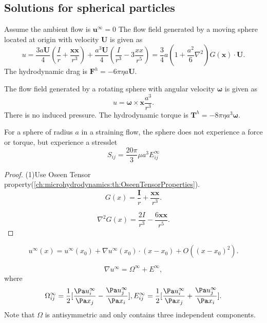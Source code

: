 \begin{refsection}
\begin{remark}
	
\end{remark}

\subsection{Solutions for spherical particles }

\begin{lemma}\cite[33,43,53]{guazzelli2011physical}
Assume the ambient flow is $\bm{u}^\infty = 0$ The flow field generated by a moving sphere located at origin with velocity $\bm{U}$ is given as 
	$$u = \frac{3a\bm{U}}{4}(\frac{I}{r} + \frac{\bm{xx}}{r^3}) + \frac{a^3\bm{U}}{4}(\frac{I}{r^3} - 3\frac{xx}{r^5}) = \frac{3}{4}a(1+\frac{a^2}{6}\nabla^2)G(\bm{x})\cdot \bm{U}.$$
The hydrodynamic drag is $\bm{F}^h = -6\pi\eta a \bm{U}$.

The flow field generated by a rotating sphere with angular velocity $\bm{\omega}$ is given as
$$u = \bm{\omega}\times \bm{x}\frac{a^3}{r^3}.$$
There is no induced pressure. The hydrodynamic torque is $\bm{T}^h = -8\pi\eta a^3 \bm{\omega}$.

For a sphere of radius $a$ in a straining flow, the sphere does not experience a force or torque, but experience a stresslet 
$$S_{ij} = \frac{20\pi}{3}\mu a^3 E_{ij}^\infty$$
\end{lemma}
\begin{proof}
(1)Use Oseen Tensor property(\autoref{ch:microhydrodynamics:th:OseenTensorProperties}).
$$G(x) = \frac{\bm{I}}{r} + \frac{\bm{xx}}{r^3}.$$
	
$$\nabla^2 G(x) = \frac{2I}{r^3} - \frac{6\bm{xx}}{r^5}.$$
\end{proof}




\begin{remark}\cite[54]{guazzelli2011physical}
	
\end{remark}



\begin{definition}
	$$u^\infty(x) = u^\infty(x_0) + \nabla u^\infty(x_0) \cdot (x - x_0) + O((x-x_0)^2).$$
	
	$$\nabla u^\infty = \Omega^\infty + E^\infty,$$
where
$$\Omega^\infty_{ij} = \frac{1}{2}[\frac{\Pa u_i^\infty}{\Pa x_j} -\frac{\Pa u_j^\infty}{\Pa x_i}], E^\infty_{ij} = \frac{1}{2}[\frac{\Pa u_i^\infty}{\Pa x_j} +\frac{\Pa u_j^\infty}{\Pa x_i}].$$
Note that $\Omega$ is antisymmetric and only contains three independent components.
\end{definition}


\end{refsection}
